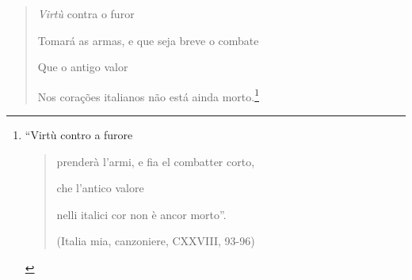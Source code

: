 \begin{quote}
\emph{Virtù} contra o furor

Tomará as armas, e que seja breve o combate

Que o antigo valor

Nos corações italianos não está ainda morto.\footnote{``Virtù contro a
  furore

  \begin{quote}
  prenderà l'armi, e fia el combatter corto,

  che l'antico valore

  nelli italici cor non è ancor morto''.

  (Italia mia, canzoniere, CXXVIII, 93-96)
  \end{quote}}
\end{quote}
